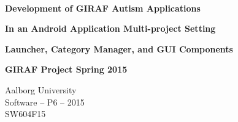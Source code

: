 
\begin{center}

	\vspace*{\fill}

	\hrulefill\newline \\

	\begin{huge}	
		\textbf{Development of GIRAF Autism Applications}
	\end{huge}

	\vspace{0.6cm}

	\begin{Large}
		\textbf{In an Android Application Multi-project Setting}
	\end{Large}

	\vspace{0.6cm}

	\begin{large}
		\textbf{Launcher, Category Manager, and GUI Components}
	\end{large}

	\vspace{1cm}

	\begin{large} 
		\textbf{GIRAF Project Spring 2015}
	\end{large}

	\hrulefill\newline

	Aalborg University		\\
	Software -- P6 -- 2015	\\
	SW604F15				\\
    
	\vspace*{\fill}

\end{center}
\thispagestyle{empty}